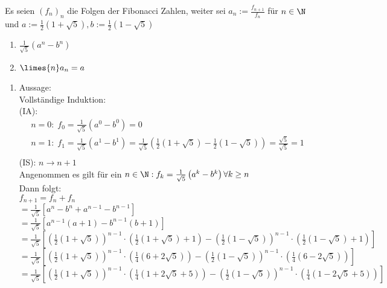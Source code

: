 \documentclass[12pt,a4paper,titlepage,draft]{article}
\begin{document}
	\begin{bsp}
		Es seien \((f_n)_n\) die Folgen der Fibonacci Zahlen, weiter sei \(a_n := \frac{f_{n+1}}{f_n}\) für \(n \in \N\) und \(a := \frac{1}{2}(1 + \sqrt{5}), b := \frac{1}{2}(1 - \sqrt{5})\)\\
		\begin{enumerate}
			\item \(\frac{1}{\sqrt{5}}\left(a^n-b^n\right)\)
			\item \(\limes{n} a_n = a\)
		\end{enumerate}
		\begin{bew}
			\begin{enumerate}
				\item Aussage:\\
					Vollständige Induktion:\\
					(IA):
					\begin{align*}
						&n = 0: \; f_0 = \frac{1}{\sqrt{5}} \left(a^0-b^0 \right) = 0\\		
						&n = 1: \; f_1 = \frac{1}{\sqrt{5}} \left(a^1-b^1 \right) = \frac{1}{\sqrt{5}} \left(\frac{1}{2}(1 + \sqrt{5})-\frac{1}{2}(1 - \sqrt{5}) \right) = \frac{\sqrt{5}}{\sqrt{5}} = 1\\		
					\end{align*}
					(IS): \(n \rightarrow n+1\)\\
					Angenommen es gilt für ein \(n \in \N: f_k = \frac{1}{\sqrt{5}}\left(a^k-b^k\right) \forall k \geq n\)\\
					Dann folgt:\\
					\(f_{n+1} = f_n + f_n\)\\
					\(= \frac{1}{\sqrt{5}}\left[a^n - b^n +a^{n-1} - b^{n-1}\right]\)\\
					\(= \frac{1}{\sqrt{5}}\left[a^{n-1}(a+1) - b^{n-1}(b+1)\right]\)\\
					\(= \frac{1}{\sqrt{5}}\left[\left(\frac{1}{2}\left(1 + \sqrt{5}\right)\right)^{n-1} \cdot\left(\frac{1}{2}\left(1 + \sqrt{5}\right)+1\right) - \left(\frac{1}{2}\left(1 - \sqrt{5}\right)\right)^{n-1}\cdot\left(\frac{1}{2}\left(1 - \sqrt{5}\right)+1\right)\right]\)\\
					\(= \frac{1}{\sqrt{5}}\left[\left(\frac{1}{2}\left(1 + \sqrt{5}\right)\right)^{n-1}\cdot\left(\frac{1}{4}\left(6 + 2\sqrt{5}\right)\right) - \left(\frac{1}{2}\left(1 - \sqrt{5}\right)\right)^{n-1}\cdot\left(\frac{1}{4}\left(6 - 2\sqrt{5}\right)\right)\right]\)\\
					\(= \frac{1}{\sqrt{5}}\left[\left(\frac{1}{2}\left(1 + \sqrt{5}\right)\right)^{n-1}\cdot\left(\frac{1}{4}\left(1 + 2\sqrt{5} + 5\right)\right) - \left(\frac{1}{2}\left(1 - \sqrt{5}\right)\right)^{n-1}\cdot\left(\frac{1}{4}\left(1 - 2\sqrt{5} + 5\right)\right)\right]\)\\

\end{enumerate}
\end{bew}
\end{bsp}
\end{document}
